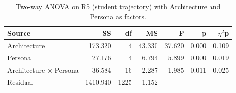 \begin{table}[htbp]
\centering
\caption{Two-way ANOVA on R5 (student trajectory) with Architecture and Persona as factors.}
\label{tab:anova-R5}
\begin{tabular}{lrrrrrr}
\toprule
Source & SS & df & MS & F & p & $\eta$$^2$p \\
\midrule
Architecture & 173.320 & 4 & 43.330 & 37.620 & 0.000 & 0.109 \\
Persona & 27.176 & 4 & 6.794 & 5.899 & 0.000 & 0.019 \\
Architecture $\times$ Persona & 36.584 & 16 & 2.287 & 1.985 & 0.011 & 0.025 \\
Residual & 1410.940 & 1225 & 1.152 & --- & --- & --- \\
\bottomrule
\end{tabular}
\end{table}
